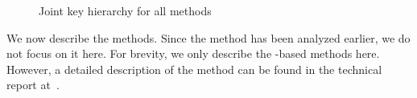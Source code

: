\begin{figure}[!h]
\scalebox{.75}{

}
\caption{Joint key hierarchy for all methods}
\label{fig:kdfdiagram}
\end{figure}

We now describe the \mEdhoc{} methods.
%
Since the \mSigSig{} method has been analyzed earlier, we do not focus on
it here.
%
For brevity, we only describe the \mStat-based methods here.
%
However, a detailed description of the \mPskPsk{} method can be found in the
technical report at~\cite{edhocTamarinRepo}. 
%

%
%
